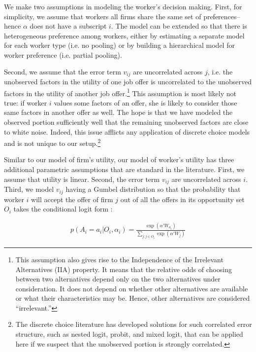 We make two assumptions in modeling the worker's decision making. First, for
simplicity, we assume that workers all firms share the same set of
preferences--hence $\alpha$ does not have a subscript $i$. The model can be 
extended so that there is heterogeneous preference among workers, either by
estimating a separate model for each worker type (i.e. no pooling) or by
building a hierarchical model for worker preference (i.e. partial pooling).

Second, we assume that the error term $v_{ij}$ are uncorrelated across $j$, i.e.
the unobserved factors in the utility of one job offer is uncorrelated to the
unobserved factors in the utility of another job offer.\footnote{This assumption
also gives rise to the Independence of the Irrelevant Alternatives (IIA)
property. It means that the relative odds of choosing between two
alternatives depend only on the two alternatives under consideration. It does
not depend on whether other alternatives are available or what their
characteristics may be. Hence, other alternatives are considered ``irrelevant.''} This assumption is most
likely not true: if worker $i$ values some factors of an offer, she is likely
to consider those same factors in another offer as well. The hope is that we
have modeled the observed portion sufficiently well that the remaining
unobserved factors are close to white noise. Indeed, this issue afflicts any application of discrete choice
models and is not unique to our setup.\footnote{The discrete choice literature has
  developed solutions for such correlated error structure, such as nested logit,
  probit, and mixed logit, that can be applied here if we suspect that the
  unobserved portion is strongly correlated.}

Similar to our model of firm's utility, our model of worker's utility has three
additional parametric assumptions that are standard in the literature. First, we
assume that utility is linear. Second, the error term $v_{ij}$ are uncorrelated
across $i$. Third, we model $v_{ij}$ having a Gumbel distribution so that the probability that worker $i$ will accept the offer of firm $j$ out of all the offers in its opportunity set $O_i$ takes the conditional logit form \citep{Cameron2005}:

\begin{align}
p(A_i = a_i | O_i, \alpha_i) = \frac{\exp(\alpha'W_{a_i})}{\sum\limits_{j:j \in O_i} \exp(\alpha'W_j)} \label{eq:conditional_probability_of_accept}
\end{align}

